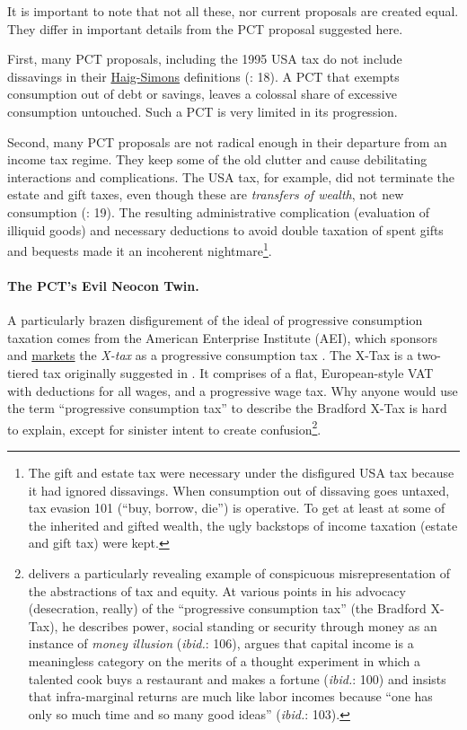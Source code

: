It is important to note that not all these, nor current proposals are created equal. They differ in important details from the PCT proposal suggested here.

First, many PCT proposals, including the 1995 USA tax do not include dissavings in their \hyperref[eq:HaigSimonsPCT]{Haig-Simons} definitions (\citealt{Bank2004}: 18). A PCT that exempts consumption out of debt or savings, leaves a colossal share of excessive consumption untouched. Such a PCT is very limited in its progression.

Second, many PCT proposals are not radical enough in their departure from an income tax regime. They keep some of the old clutter and cause debilitating interactions and complications. The USA tax, for example, did not terminate the estate and gift taxes, even though these are \emph{transfers of wealth}, not new consumption (\citealt{Bank2004}: 19). The resulting administrative complication (evaluation of illiquid goods) and necessary deductions to avoid double taxation of spent gifts and bequests made it an incoherent nightmare\footnote{
	The gift and estate tax were necessary under the disfigured USA tax because it had ignored dissavings. When consumption out of dissaving goes untaxed, tax evasion 101 (``buy, borrow, die'') is operative. To get at least at some of the inherited and gifted wealth, the ugly backstops of income taxation (estate and gift tax) were kept.}.

\paragraph{The PCT's Evil Neocon Twin.} A particularly brazen disfigurement of the ideal of progressive consumption taxation comes from the American Enterprise Institute (AEI), which sponsors and \hyperref[http://www.aei.org/outlook/29082]{markets} the \emph{\citeauthor{Bradford} X-tax} as a progressive consumption tax \citep{Bradford}. The \citeauthor{Bradford1986} X-Tax is a two-tiered tax originally suggested in \citeyear{Bradford1986}. It comprises of a flat, European-style VAT with deductions for all wages, and a progressive wage tax.
Why anyone would use the term ``progressive consumption tax'' to describe the Bradford X-Tax is hard to explain, except for sinister intent to create confusion\footnote{
	\cite{Shaviro2004} delivers a particularly revealing example of conspicuous misrepresentation of the abstractions of tax and equity. At various points in his advocacy (desecration, really) of the ``progressive consumption tax'' (the Bradford X-Tax), he describes power, social standing or security through money as an instance of \emph{money illusion} (\emph{ibid.}: 106), argues that capital income is a meaningless category on the merits of a thought experiment in which a talented cook buys a restaurant and makes a fortune (\emph{ibid.}: 100) and insists that infra-marginal returns are much like labor incomes because ``one has only so much time and so many good ideas'' (\emph{ibid.}: 103).}.

